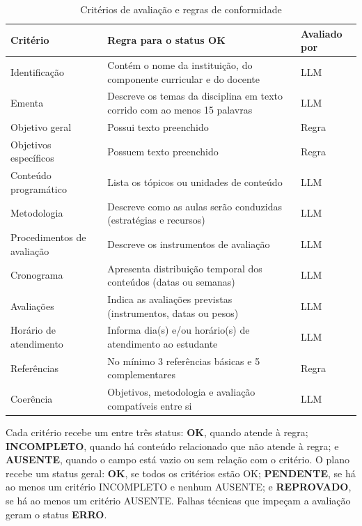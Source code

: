 \begin{table}[H]
\centering
\caption{Critérios de avaliação e regras de conformidade}
\label{tab:criterios}
\footnotesize
\begin{tabular}{@{}L{3.3cm}L{9.0cm}L{2.0cm}@{}}
\toprule
{}
\textbf{Critério} & \textbf{Regra para o status OK} & \textbf{Avaliado por} \\ \midrule
Identificação & Contém o nome da instituição, do componente curricular e do docente & LLM \\
Ementa & Descreve os temas da disciplina em texto corrido com ao menos 15 palavras & LLM \\
Objetivo geral & Possui texto preenchido & Regra \\
Objetivos específicos & Possuem texto preenchido & Regra \\
Conteúdo programático & Lista os tópicos ou unidades de conteúdo & LLM \\
Metodologia & Descreve como as aulas serão conduzidas (estratégias e recursos) & LLM \\
Procedimentos de avaliação & Descreve os instrumentos de avaliação & LLM \\
Cronograma & Apresenta distribuição temporal dos conteúdos (datas ou semanas) & LLM \\
Avaliações & Indica as avaliações previstas (instrumentos, datas ou pesos) & LLM \\
Horário de atendimento & Informa dia(s) e/ou horário(s) de atendimento ao estudante & LLM \\
Referências & No mínimo 3 referências básicas e 5 complementares & Regra \\
Coerência & Objetivos, metodologia e avaliação compatíveis entre si & LLM \\ \bottomrule
\end{tabular}
\end{table}

Cada critério recebe um entre três status: \textbf{OK}, quando atende à regra; \textbf{INCOMPLETO}, quando há conteúdo relacionado que não atende à regra; e \textbf{AUSENTE}, quando o campo está vazio ou sem relação com o critério. O plano recebe um status geral: \textbf{OK}, se todos os critérios estão OK; \textbf{PENDENTE}, se há ao menos um critério INCOMPLETO e nenhum AUSENTE; e \textbf{REPROVADO}, se há ao menos um critério AUSENTE. Falhas técnicas que impeçam a avaliação geram o status \textbf{ERRO}.

